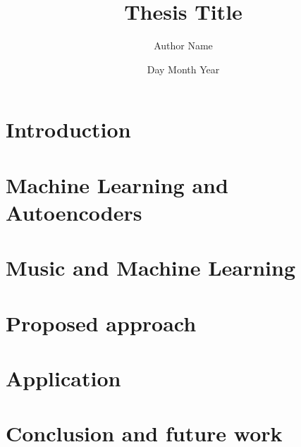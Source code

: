 \documentclass[12pt,twoside]{report}
\title{Thesis Title}
\author{Author Name}
\date{Day Month Year}
\begin{document}








\tableofcontents

\listoffigures

\renewcommand\listoflistingscaption{List of Source Codes}
\listoflistings
{}





\chapter{Introduction}


\chapter{Machine Learning and Autoencoders}


\chapter{Music and Machine Learning}


\chapter{Proposed approach}


\chapter{Application}


\chapter{Conclusion and future work}


% 

% 



\end{document}

